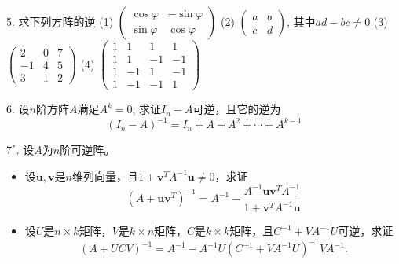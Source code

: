 \begin{frame}

5. 求下列方阵的逆
\newline \vspace{0.5em}
(1) $\begin{pmatrix} \cos\varphi & -\sin\varphi \\ \sin\varphi & \cos\varphi \end{pmatrix}$ \quad (2) $\begin{pmatrix} a & b \\ c & d \end{pmatrix}$, 其中$ad-bc\neq 0$
\newline \vspace{0.5em}
(3) $\begin{pmatrix} 2 & 0 & 7 \\ -1 & 4 & 5 \\ 3 & 1 & 2 \end{pmatrix}$ \qquad\quad (4) $\begin{pmatrix} 1 & 1 & 1 & 1 \\ 1 & 1 & -1 & -1 \\ 1 & -1 & 1 & -1 \\ 1 & -1 & -1 & 1 \end{pmatrix}$

\vspace{1em}

6. 设$n$阶方阵$A$满足$A^k = 0$, 求证$I_n-A$可逆，且它的逆为
\[(I_n-A)^{-1} = I_n + A + A^2 + \cdots + A^{k-1}\]

\end{frame}


\begin{frame}

7$^*$. 设$A$为$n$阶可逆阵。
\begin{itemize}
\item[(1)] 设$\mathbf{u}, \mathbf{v}$是$n$维列向量，且$1 + \mathbf{v}^T A^{-1} \mathbf{u} \neq 0$，求证
\[(A+\mathbf{u}\mathbf{v}^T)^{-1} = A^{-1} - \frac{A^{-1} \mathbf{u} \mathbf{v}^T A^{-1}}{1 + \mathbf{v}^T A^{-1} \mathbf{u}}\]
\item[(2)] 设$U$是$n\times k$矩阵，$V$是$k\times n$矩阵，$C$是$k\times k$矩阵，且$ C^{-1}+VA^{-1}U$可逆，求证
\[ \left(A+UCV \right)^{-1} = A^{-1} - A^{-1}U \left(C^{-1}+VA^{-1}U \right)^{-1} VA^{-1}.\]
\end{itemize}

\end{frame}

